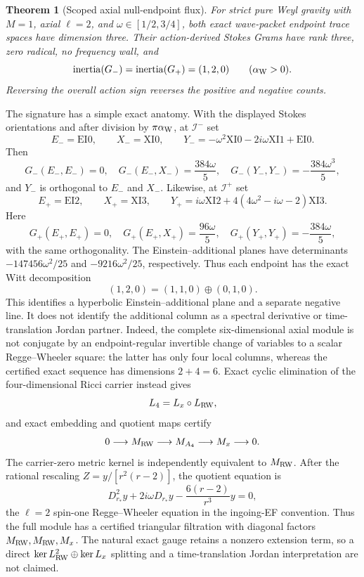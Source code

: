 \documentclass[11pt]{article}
\newtheorem{theorem}{Theorem}[section]
\theoremstyle{definition}
\theoremstyle{remark}
\begin{document}
\begin{theorem}[Scoped axial null-endpoint flux]
For strict pure Weyl gravity with \(M=1\), axial \(\ell=2\), and
\(\omega\in[1/2,3/4]\), both exact wave-packet endpoint trace spaces have
dimension three.  Their action-derived Stokes Grams have rank three, zero
radical, no frequency wall, and
\[
 \operatorname{inertia}(G_-)
 =\operatorname{inertia}(G_+)=(1,2,0)
 \qquad(\alpha_{\rm W}>0).
\]
Reversing the overall action sign reverses the positive and negative counts.
\end{theorem}

The signature has a simple exact anatomy.  With the displayed Stokes
orientations and after division by \(\pi\alpha_{\rm W}\), at
\(\mathscr I^-\) set
\[
 E_-=\mathrm{EI0},\qquad X_-=\mathrm{XI0},\qquad
 Y_-=-\omega^2\mathrm{XI0}-2i\omega\mathrm{XI1}+\mathrm{EI0}.
\]
Then
\[
 G_-(E_-,E_-)=0,\quad
 G_-(E_-,X_-)=\frac{384\omega}{5},\quad
 G_-(Y_-,Y_-)=-\frac{384\omega^3}{5},
\]
and \(Y_-\) is orthogonal to \(E_-\) and \(X_-\).  Likewise, at
\(\mathscr I^+\) set
\[
 E_+=\mathrm{EI2},\qquad X_+=\mathrm{XI3},\qquad
 Y_+=i\omega\mathrm{XI2}
      +4(4\omega^2-i\omega-2)\mathrm{XI3}.
\]
Here
\[
 G_+(E_+,E_+)=0,\quad
 G_+(E_+,X_+)=\frac{96\omega}{5},\quad
 G_+(Y_+,Y_+)=-\frac{384\omega}{5},
\]
with the same orthogonality.  The Einstein--additional planes have
determinants \(-147456\omega^2/25\) and
\(-9216\omega^2/25\), respectively.  Thus each endpoint has the exact Witt
decomposition
\[
 (1,2,0)=(1,1,0)\oplus(0,1,0).
\]
This identifies a hyperbolic Einstein--additional plane and a separate
negative line.  It does not identify the additional column as a spectral
derivative or time-translation Jordan partner.  Indeed, the complete
six-dimensional axial module is not conjugate by an endpoint-regular
invertible change of variables to a scalar Regge--Wheeler square: the latter
has only four local columns, whereas the certified exact sequence has
dimensions \(2+4=6\).  Exact cyclic elimination of the four-dimensional
Ricci carrier instead gives
\[
 L_4=L_x\circ L_{\rm RW},
\]
and exact embedding and quotient maps certify
\[
 0\longrightarrow M_{\rm RW}
 \longrightarrow M_{A_4}
 \longrightarrow M_x
 \longrightarrow0.
\]
The carrier-zero metric kernel is independently equivalent to
\(M_{\rm RW}\).  After the rational rescaling
\(Z=y/[r^2(r-2)]\), the quotient equation is
\[
 D_{r_*}^2y+2i\omega D_{r_*}y
 -\frac{6(r-2)}{r^3}y=0,
\]
the \(\ell=2\) spin-one Regge--Wheeler equation in the ingoing-EF
convention.  Thus the full module has a certified triangular filtration
with diagonal factors \(M_{\rm RW},M_{\rm RW},M_x\).  The natural exact
gauge retains a nonzero extension term, so a direct
\(\ker L_{\rm RW}^2\oplus\ker L_x\) splitting and a time-translation
Jordan interpretation are not claimed.
\end{document}
